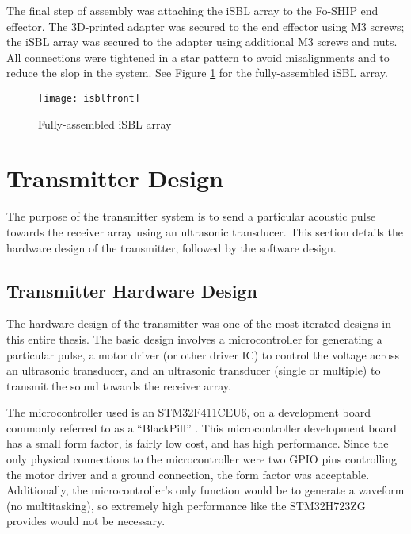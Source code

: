 \documentclass[11pt]{ucthesisCP}
\begin{document}
The final step of assembly was attaching the iSBL array to the Fo-SHIP end effector. The 3D-printed adapter was secured to the end effector using M3 screws; the iSBL array was secured to the adapter using additional M3 screws and nuts. All connections were tightened in a star pattern to avoid misalignments and to reduce the slop in the system. See Figure \ref{fig:isblfront} for the fully-assembled iSBL array.

\begin{figure}[htbp]
	\centering
	\texttt{[image: isblfront]}
	\caption{Fully-assembled iSBL array}
	\label{fig:isblfront}
\end{figure}

\section{Transmitter Design} \label{sec:3s6}
The purpose of the transmitter system is to send a particular acoustic pulse towards the receiver array using an ultrasonic transducer. This section details the hardware design of the transmitter, followed by the software design.

\subsection{Transmitter Hardware Design} \label{ssec:3s6s1}
The hardware design of the transmitter was one of the most iterated designs in this entire thesis. The basic design involves a microcontroller for generating a particular pulse, a motor driver (or other driver IC) to control the voltage across an ultrasonic transducer, and an ultrasonic transducer (single or multiple) to transmit the sound towards the receiver array. 

The microcontroller used is an STM32F411CEU6, on a development board commonly referred to as a “BlackPill” \cite{blackpill}. This microcontroller development board has a small form factor, is fairly low cost, and has high performance. Since the only physical connections to the microcontroller were two GPIO pins controlling the motor driver and a ground connection, the form factor was acceptable. Additionally, the microcontroller’s only function would be to generate a waveform (no multitasking), so extremely high performance like the STM32H723ZG provides would not be necessary.
\end{document}
